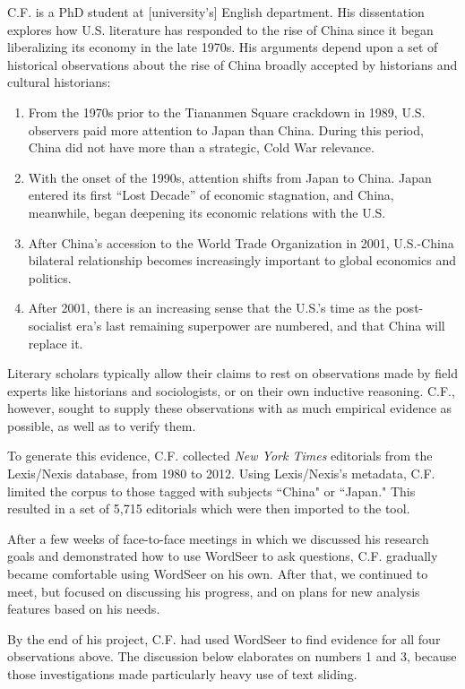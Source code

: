 \documentclass{sig-alternate}
\begin{document}
\begin{enumerate}
C.F. is a PhD student at [university's] English department. His dissentation explores how U.S. literature has responded to the rise of China since it began liberalizing its economy in the late 1970s.  His arguments depend upon a set of historical observations about the rise of China  broadly accepted by historians and cultural historians: 
\begin{enumerate}
\item From the 1970s prior to the Tiananmen Square crackdown in 1989, U.S. observers paid more attention to Japan than China. During this period, China did not have  more than a strategic, Cold War relevance. 
\item With the onset of the 1990s, attention shifts from Japan to China. Japan entered its first ``Lost Decade'' of economic stagnation, and China, meanwhile, began deepening its economic relations with the U.S.
\item After China's accession to the World Trade Organization in 2001, U.S.-China bilateral relationship becomes increasingly important to global economics and politics.
\item After 2001, there is an increasing sense that the U.S.'s time as the post-socialist era's last remaining superpower are numbered, and that China will replace it.
\end{enumerate}
Literary scholars typically allow their claims to rest on observations made by field experts like historians and sociologists, or on their own inductive reasoning. C.F., however, sought to supply these observations with as much empirical evidence as possible, as well as to verify them.

To generate this evidence, C.F. collected \emph{New York Times} editorials from  the Lexis/Nexis database, from 1980 to 2012. Using Lexis/Nexis's metadata, C.F. limited the corpus to those tagged with subjects ``China" or ``Japan." This resulted in a set of 5,715 editorials which were then imported to the tool.

After a few weeks of face-to-face meetings in which we discussed his research goals and demonstrated how to use WordSeer to ask questions, C.F. gradually became comfortable using WordSeer on his own. After that, we continued to meet, but focused on discussing his progress, and on plans for new analysis features based on his needs.

By the end of his project, C.F. had used WordSeer to find evidence for all four observations above. The discussion below elaborates on numbers 1 and 3, because those investigations made particularly heavy use of text sliding.



\end{enumerate}
\end{document}
